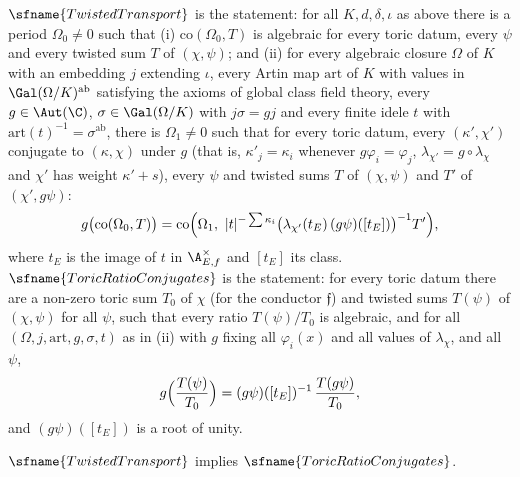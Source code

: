 $\sfname{TwistedTransport}$ is the statement: for all $K,d,\delta,\iota$ as above there is a period $\Omega_0\ne0$ such that
(i) $\mathrm{co}(\Omega_0,T)$ is algebraic for every toric datum, every $\psi$ and every twisted sum $T$ of $(\chi,\psi)$; and
(ii) for every algebraic closure $\Omega$ of $K$ with an embedding $j$ extending $\iota$, every Artin map $\mathrm{art}$ of $K$
with values in $\Gal(\Omega/K)^{\mathrm{ab}}$ satisfying the axioms of global class field theory, every $g\in\Aut(\C)$,
$\sigma\in\Gal(\Omega/K)$ with $j\sigma=gj$ and every finite idele $t$ with $\mathrm{art}(t)^{-1}=\sigma^{\mathrm{ab}}$, there is
$\Omega_1\ne0$ such that for every toric datum, every $(\kappa',\chi')$ conjugate to $(\kappa,\chi)$ under $g$ (that is,
$\kappa'_j=\kappa_i$ whenever $g\varphi_i=\varphi_j$, $\lambda_{\chi'}=g\circ\lambda_\chi$ and $\chi'$ has weight $\kappa'+s$), every $\psi$
and twisted sums $T$ of $(\chi,\psi)$ and $T'$ of $(\chi',g\psi)$:
\[
g\bigl(\mathrm{co}(\Omega_0,T)\bigr)=\mathrm{co}\Bigl(\Omega_1,\ |t|^{-\sum\kappa_i}\bigl(\lambda_{\chi'}(t_E)\,(g\psi)([t_E])\bigr)^{-1}T'\Bigr),
\]
where $t_E$ is the image of $t$ in $\A_{E,f}^\times$ and $[t_E]$ its class.
$\sfname{ToricRatioConjugates}$ is the statement: for every toric datum there are a non-zero toric sum $T_0$ of $\chi$ (for the
conductor $\mathfrak f$) and twisted sums $T(\psi)$ of $(\chi,\psi)$ for all $\psi$, such that every ratio $T(\psi)/T_0$ is algebraic,
and for all $(\Omega,j,\mathrm{art},g,\sigma,t)$ as in (ii) with $g$ fixing all $\varphi_i(x)$ and all values of $\lambda_\chi$, and all
$\psi$,
\begin{equation}\label{eq:pf:sh-div:toricconj}
g\Bigl(\frac{T(\psi)}{T_0}\Bigr)=(g\psi)([t_E])^{-1}\,\frac{T(g\psi)}{T_0},
\end{equation}
and $(g\psi)([t_E])$ is a root of unity.

\begin{proposition}\label{pf:sh-div:toric}
$\sfname{TwistedTransport}$ implies $\sfname{ToricRatioConjugates}$.
\end{proposition}

